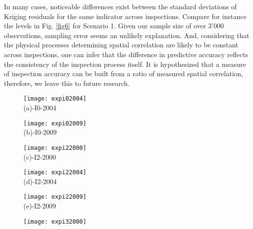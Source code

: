 \documentclass[Journal]{ascelike}
\begin{document}
In many cases, noticeable differences exist between the standard deviations of
Kriging residuals for the same indicator across inspections. Compare for instance the
levels in Fig. \ref{fig6} for Scenario 1. Given our sample size of over 3'000
observations, sampling error seems an unlikely explanation. And, considering that the
physical processes determining spatial correlation are likely to be constant across
inspections, one can infer that the difference in predictive accuracy reflects the
consistency of the inspection process itself. It is hypothesized that a measure of
inspection accuracy can be built from a ratio of measured spatial correlation, therefore, we
leave this to future research.

\begin{figure}
     \begin{minipage}[h]{0.5\linewidth}
        \centering
        \texttt{[image: expi02004]}\\
				\footnotesize{(a)-I0-2004}
     \end{minipage}
\vspace{1.5mm}
    \begin{minipage}[h]{0.5\linewidth}
       \centering
       \texttt{[image: expi02009]}\\
			\footnotesize{(b)-I0-2009}
     \end{minipage}
\vspace{1.5mm}
    \begin{minipage}[h]{0.5\linewidth}
       \centering
       \texttt{[image: expi22000]}\\
			\footnotesize{(c)-I2-2000}
     \end{minipage}
\vspace{1.5mm}
    \begin{minipage}[h]{0.5\linewidth}
       \centering
       \texttt{[image: expi22004]}\\
			\footnotesize{(d)-I2-2004}
     \end{minipage}
\vspace{1.5mm}
    \begin{minipage}[h]{0.5\linewidth}
       \centering
       \texttt{[image: expi22009]}\\
			\footnotesize{(e)-I2-2009}
     \end{minipage}
\vspace{1.5mm}
    \begin{minipage}[h]{0.5\linewidth}
       \centering
       \texttt{[image: expi32000]}\\

\end{minipage}
\end{figure}
\end{document}
